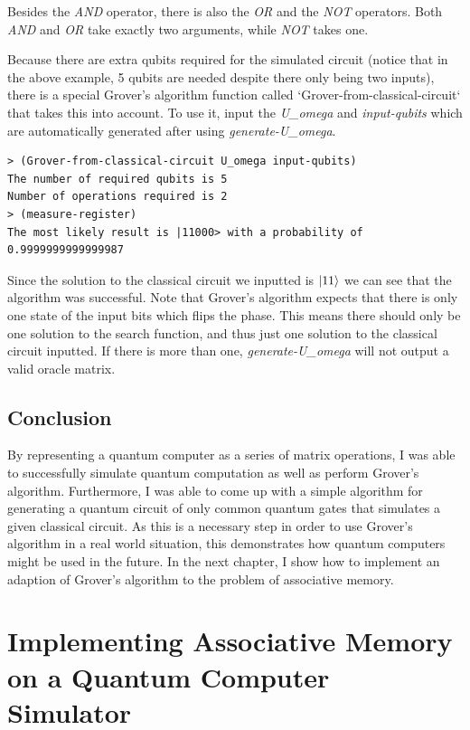 \documentclass[11pt]{report}
\newcommand{\?}{\stackrel{?}{=}}
\begin{document}
Besides the \textit{AND} operator, there is also the \textit{OR} and the \textit{NOT} operators. Both \textit{AND} and \textit{OR} take exactly two arguments, while \textit{NOT} takes one.

Because there are extra qubits required for the simulated circuit (notice that in the above example, 5 qubits are needed despite there only being two inputs), there is a special Grover's algorithm function called `Grover-from-classical-circuit` that takes this into account. To use it, input the \textit{U\_omega} and \textit{input-qubits} which are automatically generated after using \textit{generate-U\_omega}.

\begin{lstlisting}
> (Grover-from-classical-circuit U_omega input-qubits)
The number of required qubits is 5
Number of operations required is 2
> (measure-register)
The most likely result is |11000> with a probability of 0.9999999999999987
\end{lstlisting}

Since the solution to the classical circuit we inputted is $\Ket{11}$ we can see that the algorithm was successful. Note that Grover's algorithm expects that there is only one state of the input bits which flips the phase. This means there should only be one solution to the search function, and thus just one solution to the classical circuit inputted. If there is more than one, \textit{generate-U\_omega} will not output a valid oracle matrix.

\section{Conclusion}

By representing a quantum computer as a series of matrix operations, I was able to successfully simulate quantum computation as well as perform Grover's algorithm. Furthermore, I was able to come up with a simple algorithm for generating a quantum circuit of only common quantum gates that simulates a given classical circuit. As this is a necessary step in order to use Grover's algorithm in a real world situation, this demonstrates how quantum computers might be used in the future. In the next chapter, I show how to implement an adaption of Grover's algorithm to the problem of associative memory.


\chapter{Implementing Associative Memory on a Quantum Computer Simulator}
\end{document}
